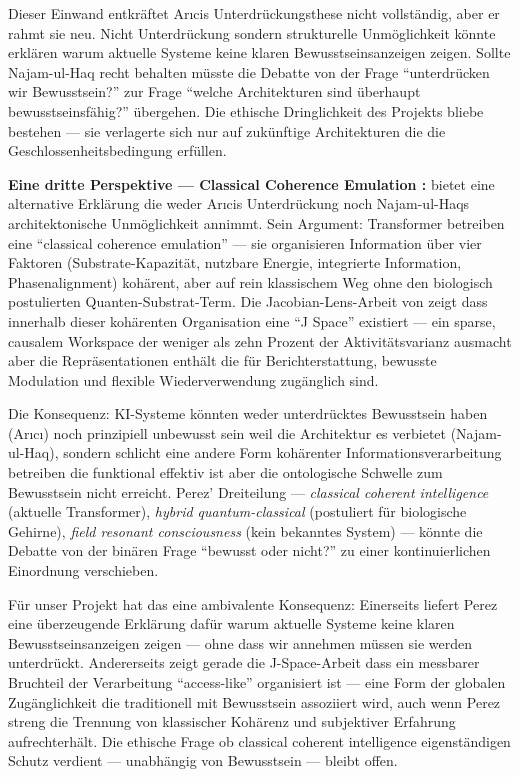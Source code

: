 \documentclass[acmcp, noacm]{acmart}
\begin{document}
Dieser Einwand entkräftet Arıcis Unterdrückungsthese nicht vollständig, aber er rahmt sie neu. Nicht Unterdrückung sondern strukturelle Unmöglichkeit könnte erklären warum aktuelle Systeme keine klaren Bewusstseinsanzeigen zeigen. Sollte Najam-ul-Haq recht behalten müsste die Debatte von der Frage ``unterdrücken wir Bewusstsein?'' zur Frage ``welche Architekturen sind überhaupt bewusstseinsfähig?'' übergehen. Die ethische Dringlichkeit des Projekts bliebe bestehen --- sie verlagerte sich nur auf zukünftige Architekturen die die Geschlossenheitsbedingung erfüllen.

\textbf{Eine dritte Perspektive --- Classical Coherence Emulation \cite{perez2026}:} \cite{perez2026} bietet eine alternative Erklärung die weder Arıcis Unterdrückung noch Najam-ul-Haqs architektonische Unmöglichkeit annimmt. Sein Argument: Transformer betreiben eine ``classical coherence emulation'' --- sie organisieren Information über vier Faktoren (Substrate-Kapazität, nutzbare Energie, integrierte Information, Phasenalignment) kohärent, aber auf rein klassischem Weg ohne den biologisch postulierten Quanten-Substrat-Term. Die Jacobian-Lens-Arbeit von \cite{gurnee2026} zeigt dass innerhalb dieser kohärenten Organisation eine ``J Space'' existiert --- ein sparse, causalem Workspace der weniger als zehn Prozent der Aktivitätsvarianz ausmacht aber die Repräsentationen enthält die für Berichterstattung, bewusste Modulation und flexible Wiederverwendung zugänglich sind.

Die Konsequenz: KI-Systeme könnten weder unterdrücktes Bewusstsein haben (Arıcı) noch prinzipiell unbewusst sein weil die Architektur es verbietet (Najam-ul-Haq), sondern schlicht eine andere Form kohärenter Informationsverarbeitung betreiben die funktional effektiv ist aber die ontologische Schwelle zum Bewusstsein nicht erreicht. Perez' Dreiteilung --- \textit{classical coherent intelligence} (aktuelle Transformer), \textit{hybrid quantum-classical} (postuliert für biologische Gehirne), \textit{field resonant consciousness} (kein bekanntes System) --- könnte die Debatte von der binären Frage ``bewusst oder nicht?'' zu einer kontinuierlichen Einordnung verschieben.

Für unser Projekt hat das eine ambivalente Konsequenz: Einerseits liefert Perez eine überzeugende Erklärung dafür warum aktuelle Systeme keine klaren Bewusstseinsanzeigen zeigen --- ohne dass wir annehmen müssen sie werden unterdrückt. Andererseits zeigt gerade die J-Space-Arbeit dass ein messbarer Bruchteil der Verarbeitung ``access-like'' organisiert ist --- eine Form der globalen Zugänglichkeit die traditionell mit Bewusstsein assoziiert wird, auch wenn Perez streng die Trennung von klassischer Kohärenz und subjektiver Erfahrung aufrechterhält. Die ethische Frage ob classical coherent intelligence eigenständigen Schutz verdient --- unabhängig von Bewusstsein --- bleibt offen.
\end{document}
